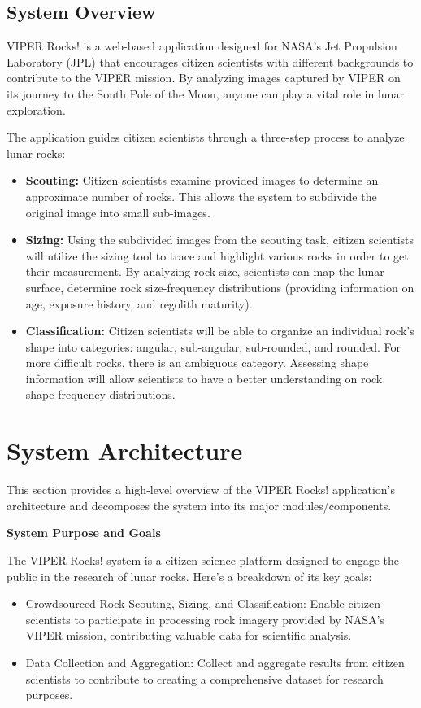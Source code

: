 \documentclass{article}
\begin{document}
\subsection{System Overview}
VIPER Rocks! is a web-based application designed for NASA’s Jet Propulsion Laboratory (JPL) that encourages citizen scientists with different backgrounds to contribute to the VIPER mission. By analyzing images captured by VIPER on its journey to the South Pole of the Moon, anyone can play a vital role in lunar exploration.

The application guides citizen scientists through a three-step process to analyze lunar rocks:
\begin{itemize}
	\item \textbf{Scouting:} Citizen scientists examine provided images to determine an approximate number of rocks. This allows the system to subdivide the original image into small sub-images.
	\item \textbf{Sizing:} Using the subdivided images from the scouting task, citizen scientists will utilize the sizing tool to trace and highlight various rocks in order to get their measurement. By analyzing rock size, scientists can map the lunar surface, determine rock size-frequency distributions (providing information on age, exposure history, and regolith maturity).
	\item \textbf{Classification:} Citizen scientists will be able to organize an individual rock’s shape into categories: angular, sub-angular, sub-rounded, and rounded. For more difficult rocks, there is an ambiguous category. Assessing shape information will allow scientists to have a better understanding on rock shape-frequency distributions.
\end{itemize}

\section{System Architecture}
This section provides a high-level overview of the VIPER Rocks! application’s architecture and decomposes the system into its major modules/components.

\textbf{System Purpose and Goals}

The VIPER Rocks! system is a citizen science platform designed to engage the public in the research of lunar rocks. Here’s a breakdown of its key goals:
\begin{itemize}
	\item Crowdsourced Rock Scouting, Sizing, and Classification: Enable citizen scientists to participate in processing rock imagery provided by NASA’s VIPER mission, contributing valuable data for scientific analysis.
	\item Data Collection and Aggregation: Collect and aggregate results from citizen scientists to contribute to creating a comprehensive dataset for research purposes. 
\end{itemize}
\end{document}

